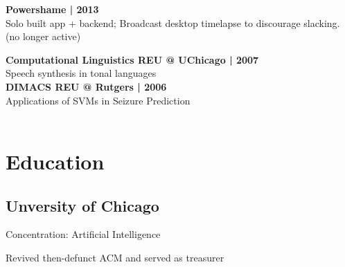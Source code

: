 \documentclass[]{resume}
\begin{document}
\begin{minipage}[t]{0.33\textwidth}
\textbf{Powershame | 2013} \\
Solo built app + backend; Broadcast desktop timelapse to discourage slacking. (no longer active)
\sectionsep

\textbf{Computational Linguistics REU @ UChicago | 2007}\\
Speech synthesis in tonal languages\\

\textbf{DIMACS REU @ Rutgers | 2006}\\
Applications of SVMs in Seizure Prediction
\\
\\
\section{Education}
\subsection{Unversity of Chicago}
\sectionsep
\begin{tightemize}
\item Concentration: Artificial Intelligence
\item Revived then-defunct ACM and served as treasurer
\end{tightemize}
\sectionsep


%
%

\end{minipage}
\hfill
\end{document}
